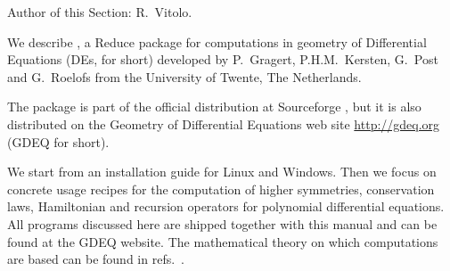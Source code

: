 






\providecommand{\cdiff}{\package{CDIFF}\xspace}



\ifdefined{}\else
\providecommand*{\pd}[2]{\mathchoice{\frac{\partial#1}{\partial#2}}
  {\partial#1/\partial#2}{\partial#1/\partial#2}
  {\partial#1/\partial#2}}
\fi
  Author of this Section: R.~Vitolo.

  We describe \cdiff, a Reduce package for computations in geometry of
  Differential Equations (DEs, for short) developed by P.~Gragert,
  P.H.M.~Kersten, G.~Post and G.~Roelofs from the University of Twente, The
  Netherlands.

  The package is part of the official \REDUCE distribution at Sourceforge
  \cite{Reduce:Obtaining}, but it is also distributed on the Geometry of Differential
  Equations web site \url{http://gdeq.org} (GDEQ for short).

  We start from an installation guide for Linux and Windows. Then we focus on
  concrete usage recipes for the computation of higher symmetries, conservation
  laws, Hamiltonian and recursion operators for polynomial differential
  equations. All programs discussed here are shipped together with this manual
  and can be found at the GDEQ website. The mathematical theory on which
  computations are based can be found in refs.~\cite{Krasilshchik:99,KerstenKrasilshchikVerboretsky:2004}.

